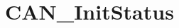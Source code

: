 \hypertarget{group___c_a_n___init_status}{\section{C\-A\-N\-\_\-\-Init\-Status}
\label{group___c_a_n___init_status}
}

